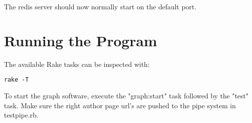 The redis server should now normally start on the default port.

\section{Running the Program}
The available Rake tasks can be inspected with:

\begin{verbatim}
rake -T
\end{verbatim}

To start the graph software, execute the "graph:start" task followed by the "test" task. Make sure the right author page url's are pushed to the pipe system in testpipe.rb.

\begin{verbatim}
\end{verbatim}